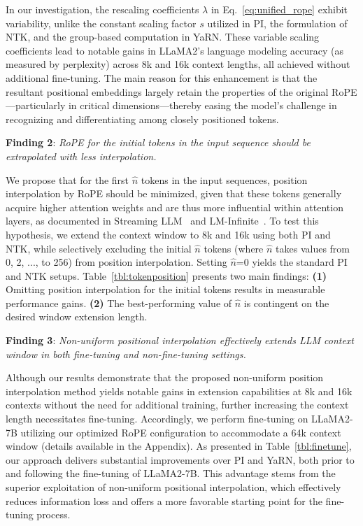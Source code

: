 In our investigation, the rescaling coefficients $\lambda$ in Eq.~\ref{eq:unified_rope} exhibit variability, unlike the constant scaling factor $s$ utilized in PI, the formulation of NTK, and the group-based computation in YaRN. These variable scaling coefficients lead to notable gains in LLaMA2’s language modeling accuracy (as measured by perplexity) across 8k and 16k context lengths, all achieved without additional fine-tuning. The main reason for this enhancement is that the resultant positional embeddings largely retain the properties of the original RoPE—particularly in critical dimensions—thereby easing the model’s challenge in recognizing and differentiating among closely positioned tokens.

\textbf{Finding 2}: \textit{RoPE for the initial tokens in the input sequence should be extrapolated with less interpolation.} 

We propose that for the first $\hat{n}$ tokens in the input sequences, position interpolation by RoPE should be minimized, given that these tokens generally acquire higher attention weights and are thus more influential within attention layers, as documented in Streaming LLM~\cite{streamingllm} and LM-Infinite~\cite{han2023lminfinite}. To test this hypothesis, we extend the context window to 8k and 16k using both PI and NTK, while selectively excluding the initial $\hat n$ tokens (where $\hat n$ takes values from 0, 2, ..., to 256) from position interpolation. Setting $\hat n$=0 yields the standard PI and NTK setups. Table~\ref{tbl:tokenposition} presents two main findings: \textbf{(1)} Omitting position interpolation for the initial tokens results in measurable performance gains. \textbf{(2)} The best-performing value of $\hat n$ is contingent on the desired window extension length.

\textbf{Finding 3}: \textit{Non-uniform positional interpolation effectively extends LLM context window in both fine-tuning and non-fine-tuning settings.} 

Although our results demonstrate that the proposed non-uniform position interpolation method yields notable gains in extension capabilities at 8k and 16k contexts without the need for additional training, further increasing the context length necessitates fine-tuning. Accordingly, we perform fine-tuning on LLaMA2-7B utilizing our optimized RoPE configuration to accommodate a 64k context window (details available in the Appendix). As presented in Table~\ref{tbl:finetune}, our approach delivers substantial improvements over PI and YaRN, both prior to and following the fine-tuning of LLaMA2-7B. This advantage stems from the superior exploitation of non-uniform positional interpolation, which effectively reduces information loss and offers a more favorable starting point for the fine-tuning process.

